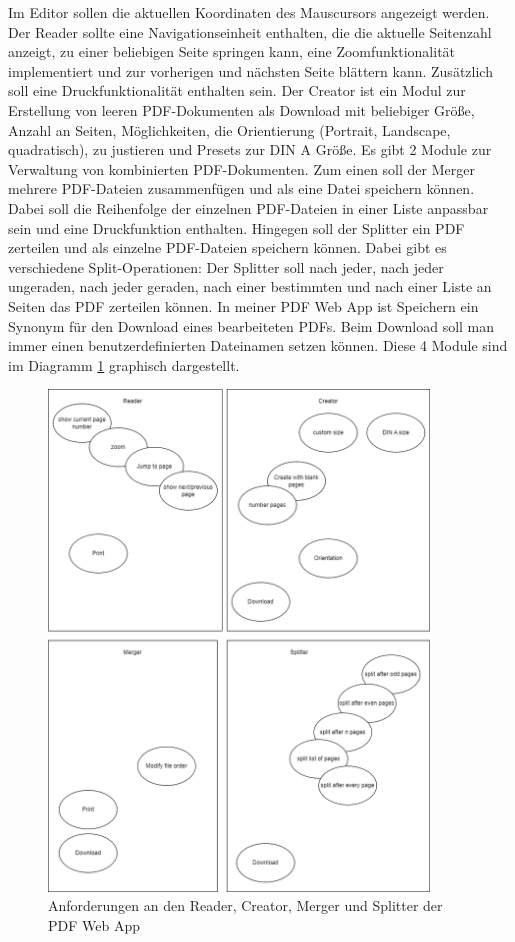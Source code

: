 Im Editor sollen die aktuellen Koordinaten des Mauscursors angezeigt werden. Der Reader sollte eine Navigationseinheit enthalten, die die aktuelle Seitenzahl anzeigt, zu einer beliebigen Seite springen kann, eine Zoomfunktionalität implementiert und zur vorherigen und nächsten Seite blättern kann. Zusätzlich soll eine Druckfunktionalität enthalten sein. Der Creator ist ein Modul zur Erstellung von leeren PDF-Dokumenten als Download mit beliebiger Größe, Anzahl an Seiten, Möglichkeiten, die Orientierung (Portrait, Landscape, quadratisch), zu justieren und Presets zur DIN A Größe. Es gibt 2 Module zur Verwaltung von kombinierten PDF-Dokumenten. Zum einen soll der Merger mehrere PDF-Dateien zusammenfügen und als eine Datei speichern können. Dabei soll die Reihenfolge der einzelnen PDF-Dateien in einer Liste anpassbar sein und eine Druckfunktion enthalten. Hingegen soll der Splitter ein PDF zerteilen und als einzelne PDF-Dateien speichern können. Dabei gibt es verschiedene Split-Operationen: Der Splitter soll nach jeder, nach jeder ungeraden, nach jeder geraden, nach einer bestimmten und nach einer Liste an Seiten das PDF zerteilen können. In meiner PDF Web App ist Speichern ein Synonym für den Download eines bearbeiteten PDFs. Beim Download soll man immer einen benutzerdefinierten Dateinamen setzen können. Diese 4 Module sind im Diagramm \ref{fig:modules4} graphisch dargestellt. 

\begin{figure}[!htbp]
	\centering
	\includegraphics[width=0.9\textwidth]{"images/app-funktionen-anforderungen.png"}
	\caption{Anforderungen an den Reader, Creator, Merger und Splitter der PDF Web App}
	\label{fig:modules4}
\end{figure}


